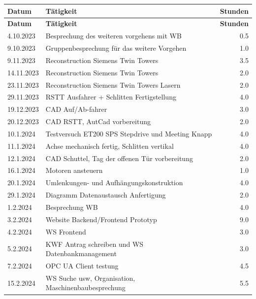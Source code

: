 \begin{longtable}{|l|p{10cm}|r|}
    \hline
    \textbf{Datum} & \textbf{Tätigkeit} & \textbf{Stunden} \\
    \hline
    \endfirsthead

    \hline
    \textbf{Datum} & \textbf{Tätigkeit} & \textbf{Stunden} \\
    \hline
    \endhead

    \hline
    \endfoot

    \hline
    \endlastfoot

4.10.2023&Besprechung des weiteren vorgehens mit WB	&0.5\\
9.10.2023&Gruppenbesprechung für das weitere Vorgehen	&1.0\\
9.11.2023&Reconstruction Siemens Twin Towers	&3.5\\
14.11.2023&	Reconstruction Siemens Twin Towers	&2.0\\
23.11.2023&	Reconstruction Siemens Twin Towers Lasern	&2.0\\
29.11.2023&	RSTT Ausfahrer + Schlitten Fertigstellung&	4.0\\
19.12.2023	&CAD Auf/Ab-fahrer	&3.0\\
20.12.2023	&CAD RSTT, AutCad vorbereitung	&2.0\\

10.1.2024	&Testversuch ET200 SPS Stepdrive und Meeting Knapp&	4.0\\
11.1.2024	&Achse mechanisch fertig, Schlitten vertikal&	4.0\\
12.1.2024	&CAD Schuttel, Tag der offenen Tür vorbereitung	&2.0\\
16.1.2024	&Motoren ansteuern&	1.0	\\
20.1.2024	&Umlenkungen- und Aufhängungskonstruktion&	4.0\\
29.1.2024	&Diagramm Datenaustausch Anfertigung&   2.0\\
1.2.2024	&Besprechung WB&	4.0\\
3.2.2024	&Website Backend/Frontend Prototyp&	9.0\\
4.2.2024	&WS Frontend&	3.0\\

5.2.2024	&KWF Antrag schreiben und WS Datenbankmanagement&	3.0\\
7.2.2024	&OPC UA Client testung&	4.5\\
15.2.2024	&WS Suche usw, Organisation, Maschinenbaubesprechung	&5.5\\


\end{longtable}
